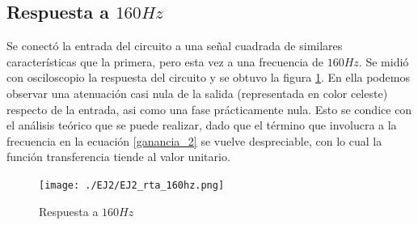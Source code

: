 \subsection{Respuesta a $160Hz$}

\quad \quad Se conect\'o la entrada del circuito a una se\~nal cuadrada de similares caracter\'isticas que la primera, pero esta vez a una frecuencia de $160Hz$. Se midi\'o con osciloscopio la respuesta del circuito y se obtuvo la figura \ref{fig:160hz_2}. En ella podemos observar una atenuaci\'on casi nula de la salida (representada en color celeste) respecto de la entrada, asi como una fase pr\'acticamente nula. Esto se condice con el an\'alisis te\'orico que se puede realizar, dado que el t\'ermino que involucra a la frecuencia en la ecuaci\'on \ref{ganancia_2} se vuelve despreciable, con lo cual la funci\'on transferencia tiende al valor unitario.

\begin{figure}[H]
    \centering
    \texttt{[image: ./EJ2/EJ2\_rta\_160hz.png]}
    \caption{Respuesta a $160Hz$}
    \label{fig:160hz_2} 
\end{figure}

